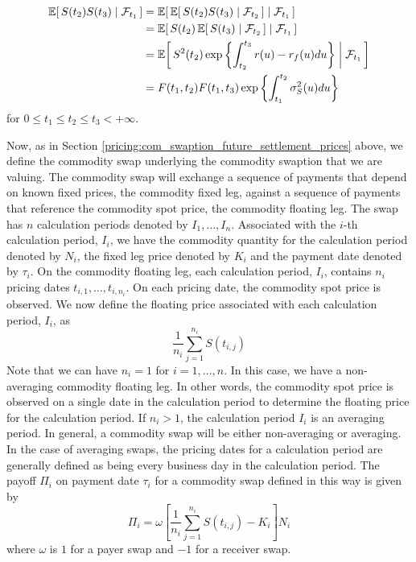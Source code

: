 \begin{equation}
\label{eq:comm_spot_exp_product}
\begin{split}
\CEx{S(t_2)S(t_3)}{\mathcal{F}_{t_1}} &= \CEx{ \CEx{S(t_2)S(t_3)}{\mathcal{F}_{t_2}} }{\mathcal{F}_{t_1}} \\
&= \CEx{S(t_2) \CEx{S(t_3)}{\mathcal{F}_{t_2}} }{\mathcal{F}_{t_1}} \\
&= \CEx{S^2(t_2) \exp \left\{ \int_{t_2}^{t_3} r(u) - r_f(u) du \right\} }{\mathcal{F}_{t_1}} \\
&= F(t_1, t_2) F(t_1, t_3) \exp \left\{ \int_{t_1}^{t_2} \sigma^2_S(u) du \right\}
\end{split}
\end{equation}
for $0 \leq t_1 \leq t_2 \leq t_3 < +\infty$.

Now, as in Section \ref{pricing:com_swaption_future_settlement_prices} above, we define the commodity swap underlying the commodity swaption that we are valuing. The commodity swap will exchange a sequence of payments that depend on known fixed prices, the commodity fixed leg, against a sequence of payments that reference the commodity spot price, the commodity floating leg. The swap has $n$ calculation periods denoted by $I_1, \ldots, I_n$. Associated with the $i$-th calculation period, $I_i$, we have the commodity quantity for the calculation period denoted by $N_i$, the fixed leg price denoted by $K_i$ and the payment date denoted by $\tau_i$. On the commodity floating leg, each calculation period, $I_i$, contains $n_i$ pricing dates $t_{i,1}, \ldots, t_{i, n_i}$. On each pricing date, the commodity spot price is observed. We now define the floating price associated with each calculation period, $I_i$, as
\begin{equation}
\frac{1}{n_i} \sum_{j=1}^{n_i} S(t_{i,j})
\end{equation}
Note that we can have $n_i = 1$ for $i = 1, \ldots, n$. In this case, we have a non-averaging commodity floating leg. In other words, the commodity spot price is observed on a single date in the calculation period to determine the floating price for the calculation period. If $n_i > 1$, the calculation period $I_i$ is an averaging period. In general, a commodity swap will be either non-averaging or averaging. In the case of averaging swaps, the pricing dates for a calculation period are generally defined as being every business day in the calculation period. The payoff $\Pi_i$ on payment date $\tau_i$ for a commodity swap defined in this way is given by
\begin{equation}
\Pi_i = \omega \left[ \frac{1}{n_i} \sum_{j=1}^{n_i} S(t_{i,j}) - K_i \right] N_i
\end{equation}
where $\omega$ is $1$ for a payer swap and $-1$ for a receiver swap.

